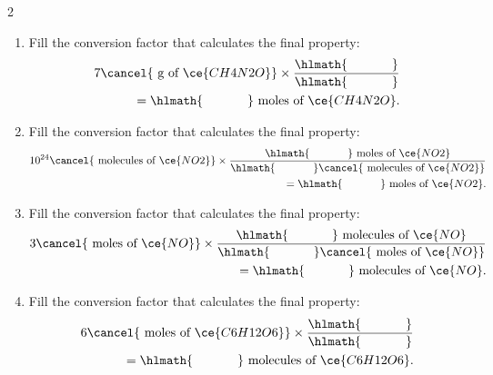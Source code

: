\documentclass[main.tex]{subfiles}
\begin{document}
\begin{multicols*}{2}
\begin{enumerate}
\item Fill the conversion factor that calculates the final property:
 \begin{equation*}\begin{split}
7\cancel{\text{ g of }\ce{CH4N2O}} \times \dfrac{\hlmath{\hspace{35pt}}}{\hlmath{\hspace{35pt}}}\\
=\hlmath{\hspace{35pt}}\text{ moles of }\ce{CH4N2O}.
\end{split}\end{equation*}


\item Fill the conversion factor that calculates the final property:
 \begin{equation*}\begin{split}
10^{24}\cancel{\text{ molecules of }\ce{NO2}} \times \dfrac{\hlmath{\hspace{35pt}}\text{ moles of }\ce{NO2}}{\hlmath{\hspace{35pt}}\cancel{\text{ molecules of }\ce{NO2}}}\\
=\hlmath{\hspace{35pt}}\text{ moles of }\ce{NO2}.
\end{split}\end{equation*}


\item Fill the conversion factor that calculates the final property:
 \begin{equation*}\begin{split}
3\cancel{\text{ moles of }\ce{NO}} \times \dfrac{\hlmath{\hspace{35pt}}\text{ molecules of }\ce{NO}}{\hlmath{\hspace{35pt}}\cancel{\text{ moles of }\ce{NO}}}\\
=\hlmath{\hspace{35pt}}\text{ molecules of }\ce{NO}.
\end{split}\end{equation*}

\item Fill the conversion factor that calculates the final property:
 \begin{equation*}\begin{split}
6\cancel{\text{ moles of }\ce{C6H12O6}} \times \dfrac{\hlmath{\hspace{35pt}}}{\hlmath{\hspace{35pt}}}\\
=\hlmath{\hspace{35pt}}\text{ molecules of }\ce{C6H12O6}.
\end{split}\end{equation*}



\end{enumerate}
\end{multicols*}
\end{document}
